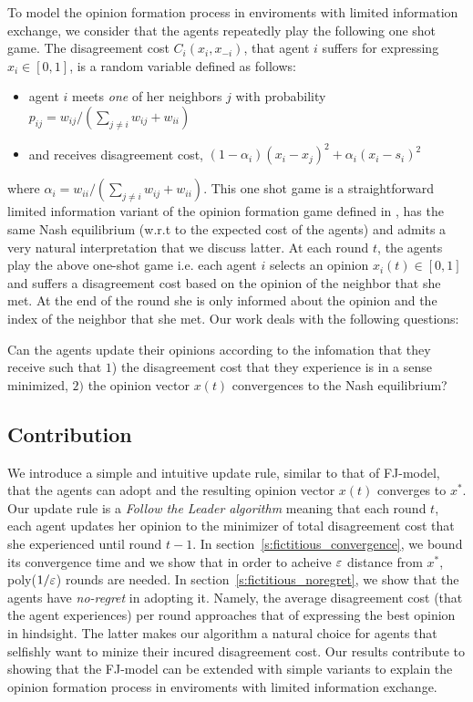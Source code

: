 To model the opinion formation process in enviroments
with limited information exchange, we consider
that the agents repeatedly play the following one shot game.
The disagreement cost $C_i(x_i,x_{-i})$, that
agent $i$ suffers for expressing $x_i \in [0,1]$, is a random variable
defined as follows:
\begin{itemize}
 \item agent $i$ meets \emph{one} of her neighbors $j$ with probability
 $p_{ij}=w_{ij}/(\sum_{j\neq i}w_{ij}+w_{ii})$
 \item and receives disagreement cost, $(1-\alpha_i)(x_i-x_j)^2 + \alpha_i(x_i-s_i)^2$
\end{itemize}
where $\alpha_i=w_{ii}/(\sum_{j\neq i}w_{ij}+w_{ii})$. This one shot game
is a straightforward limited information variant of the opinion formation game
defined in \cite{BKO11}, has the same Nash equilibrium (w.r.t
to the expected cost of the agents) and admits a very
natural interpretation that we discuss latter.
At each round $t$, the agents play the above one-shot game i.e.
each agent $i$ selects an opinion $x_i(t)\in [0,1]$ and
suffers a disagreement cost based on the opinion of the neighbor
that she met. At the end of the round she is only informed about
the opinion and the index of the neighbor that she met. Our work
deals with the following questions:
\begin{question}
Can the agents update their opinions according to the
infomation that they receive such that
$1$) the disagreement cost that they experience is in a
sense minimized, $2)$ the opinion vector $x(t)$ convergences
to the Nash equilibrium?
\end{question}

\subsection{Contribution}
We introduce a simple and intuitive update rule,
similar to that of FJ-model, that the agents can adopt
and the resulting opinion vector $x(t)$ converges to $x^*$.
Our update rule is a \emph{Follow the Leader algorithm}
meaning that each round $t$, each agent updates her opinion
to the minimizer of total disagreement cost that
she experienced until round $t-1$. In section~\ref{s:fictitious_convergence},
we bound its convergence time and we show that in order
to acheive $\varepsilon$ distance from $x^*$, poly($1/\varepsilon$) rounds
are needed. In section~\ref{s:fictitious_noregret},
we show that the agents have \emph{no-regret} in adopting
it. Namely, the average disagreement cost (that
the agent experiences) per round approaches that
of expressing the best opinion in hindsight. The latter
makes our algorithm a natural choice for agents that
selfishly want to minize their incured disagreement cost.
Our results contribute to showing that the FJ-model
can be extended with simple variants to explain
the opinion formation process in enviroments with limited
information exchange.

